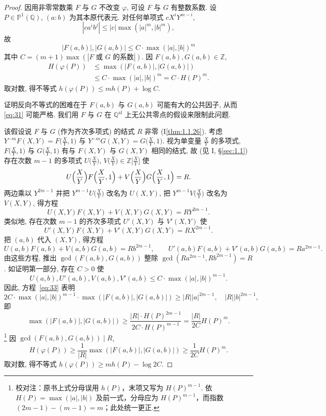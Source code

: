 \begin{proof}
因用非零常数乘 $F$ 与 $G$ 不改变 $\varphi$, 可设 $F$ 与 $G$ 有整数系数. 设 $P\in\mathbb{P}^1(\mathbb{Q})$, $(a:b)$ 为其本原代表元. 对任何单项式 $cX^iY^{m-i}$,
\[
|ca^ib^j|\le|c|\max(|a|^m, |b|^m),
\]
故
\[
|F(a,b)|, |G(a,b)|\le C\cdot\max(|a|, |b|)^m
\]
其中 $C = (m+1)\max(|F \text{ 或 } G \text{ 的系数}|)$. 因 $F(a,b), G(a,b)\in\mathbb{Z}$,
\begin{align}
    H(\varphi(P))& \le\max(|F(a,b)|, |G(a,b)|) \tag{31}\label{eq:31}\\
    & \le C\cdot\max(|a|, |b|)^m = C\cdot H(P)^m. \tag{32}\label{eq:32}
\end{align}
取对数, 得不等式 $h(\varphi(P))\le mh(P) + \log C$.

证明反向不等式的困难在于 $F(a,b)$ 与 $G(a,b)$ 可能有大的公共因子, 从而 \eqref{eq:31} 可能严格. 我们用 $F$ 与 $G$ 在 $\mathbb{Q}^{\mathrm{al}}$ 上无公共零点的假设来限制此问题.

该假设说 $F$ 与 $G$ (作为齐次多项式) 的结式 $R$ 非零 (I\ref{thm:1.1.26}). 考虑 $Y^{-m}F(X, Y) = F\bigl(\frac{X}{Y}, 1\bigr)$ 与 $Y^{-m}G(X, Y) = G\bigl(\frac{X}{Y}, 1\bigr)$. 视为单变量 $\frac{X}{Y}$ 的多项式, $F\bigl(\frac{X}{Y}, 1\bigr)$ 与 $G\bigl(\frac{X}{Y}, 1\bigr)$ 有与 $F(X, Y)$ 与 $G(X, Y)$ 相同的结式, 故 (见 I, \S\ref{sec:1.1}) 存在次数 $m-1$ 的多项式 $U\bigl(\frac{X}{Y}\bigr)$, $V\bigl(\frac{X}{Y}\bigr)\in\mathbb{Z}\bigl[\frac{X}{Y}\bigr]$ 使
\[
U\Bigl(\frac{X}{Y}\Bigr)F\Bigl(\frac{X}{Y}, 1\Bigr) + V\Bigl(\frac{X}{Y}\Bigr)G\Bigl(\frac{X}{Y}, 1\Bigr) = R.
\]
两边乘以 $Y^{2m-1}$ 并把 $Y^{m-1}U\bigl(\frac{X}{Y}\bigr)$ 改名为 $U(X, Y)$, 把 $Y^{m-1}V\bigl(\frac{X}{Y}\bigr)$ 改名为 $V(X, Y)$, 得方程
\[
U(X, Y)F(X, Y) + V(X, Y)G(X, Y) = RY^{2m-1}.
\]
类似地, 存在次数 $m-1$ 的齐次多项式 $U'(X, Y)$ 与 $V'(X, Y)$ 使
\[
U'(X, Y)F(X, Y) + V'(X, Y)G(X, Y) = RX^{2m-1}.
\]
把 $(a, b)$ 代入 $(X, Y)$, 得方程
\begin{equation} \label{eq:33}
U(a, b)F(a, b) + V(a, b)G(a, b) = Rb^{2m-1}, \qquad
U'(a, b)F(a, b) + V'(a, b)G(a, b) = Ra^{2m-1}.
\tag{33}
\end{equation}
由这些方程, 推出 $\gcd(F(a,b), G(a,b))$ 整除 $\gcd(Ra^{2m-1}, Rb^{2m-1}) = R$. 如证明第一部分, 存在 $C > 0$ 使
\[
U(a,b), U'(a,b), V(a,b), V'(a,b)\le C\cdot\max(|a|, |b|)^{m-1}.
\]
因此, 方程~\eqref{eq:33} 表明
\[
2C\cdot\max(|a|, |b|)^{m-1}\cdot\max(|F(a,b)|, |G(a,b)|)\ge |R||a|^{2m-1}, \quad |R||b|^{2m-1},
\]
即
\[
\max(|F(a,b)|, |G(a,b)|)\ge\frac{|R|\cdot H(P)^{2m-1}}{2C\cdot H(P)^{m-1}} = \frac{|R|}{2C}H(P)^m.
\]
\footnote{校对注：原书上式分母误用 $h(P)$，末项又写为 $H(P)^{m-1}$. 依 $H(P)=\max(|a|,|b|)$ 及前一式，分母应为 $H(P)^{m-1}$，而指数 $(2m-1)-(m-1)=m$；此处统一更正.} 因 $\gcd(F(a,b), G(a,b))\mid R$,
\[
H(\varphi(P))\ge\frac{1}{|R|}\max(|F(a,b)|, |G(a,b)|)\ge\frac{1}{2C}H(P)^m.
\]
取对数, 得不等式 $h(\varphi(P))\ge mh(P) - \log 2C$.
\end{proof}

